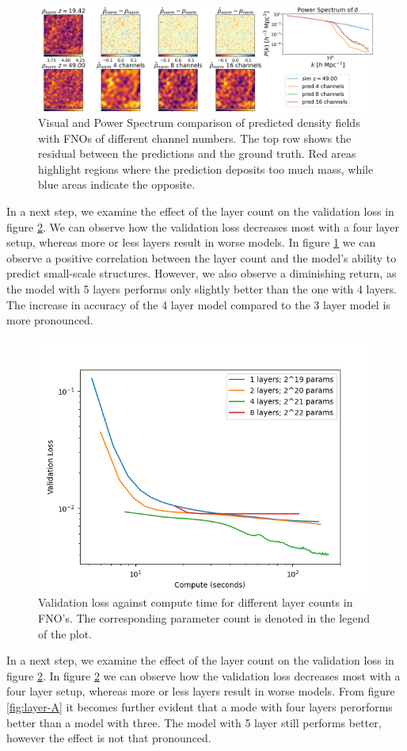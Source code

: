 \documentclass{article}
\begin{document}
\begin{figure}[t]
    \centering
    \includegraphics[width=0.95\linewidth]{img/compare_channels.png}
    \caption{Visual and Power Spectrum comparison of predicted density fields with FNOs of different channel numbers. The top row shows the residual between the predictions and the ground truth. Red areas highlight regions where the prediction deposits too much mass, while blue areas indicate the opposite.}
    \label{fig:channels-A}
\end{figure}


In a next step, we examine the effect of the layer count on the validation loss in figure \ref{fig:layer-B}. We can observe how the validation loss decreases most with a four layer setup, whereas more or less layers result in worse models. In figure \ref{fig:channels-A} we can observe a positive correlation between the layer count and the model's ability to predict small-scale structures. However, we also observe a diminishing return, as the model with 5 layers performs only slightly better than the one with 4 layers. The increase in accuracy of the 4 layer model compared to the 3 layer model is more pronounced. 

\begin{figure}[h]
    \centering
    \includegraphics[width=0.4\linewidth]{img/layer_compute.png}
    \caption{Validation loss against compute time for different layer counts in FNO's. The corresponding parameter count is denoted in the legend of the plot.}
    \label{fig:layer-B}
\end{figure}


In a next step, we examine the effect of the layer count on the validation loss in figure \ref{fig:layer-B}. In figure \ref{fig:layer-B} we can observe how the validation loss decreases most with a four layer setup, whereas more or less layers result in worse models. From figure \ref{fig:layer-A} it becomes further evident that a mode with four layers perorforms better than a model with three. The model with 5 layer still performs better, however the effect is not that pronounced. 
\end{document}
